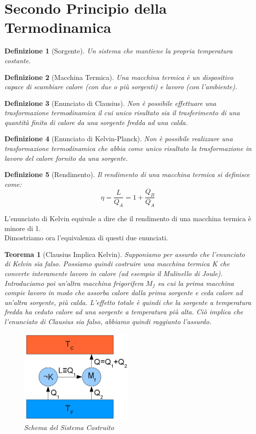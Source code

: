 \documentclass{article}
\newtheorem{thm}{Teorema}[section]
\newtheorem{defn}{Definizione}[section]
\newcommand{\note}{\noindent {\quad \bf \underline{Osservazione:}} \quad}
\begin{document}
\section{Secondo Principio della Termodinamica}
\begin{defn}[Sorgente]
Un sistema che mantiene la propria temperatura costante.
\end{defn}
\begin{defn}[Macchina Termica]
Una macchina termica è un dispositivo capace di scambiare calore (con due o più sorgenti) e lavoro (con l'ambiente). 
\end{defn}
\begin{defn}[Enunciato di Clausius]
Non è possibile effettuare una trasformazione termodinamica il cui unico risultato sia il trasferimento di una quantità finita di calore da una sorgente fredda ad una calda.
\end{defn}
\begin{defn}[Enunciato di Kelvin-Planck]
Non è possibile realizzare una trasformazione termodinamica che abbia come unico risultato la trasformazione in lavoro del calore fornito da una sorgente.
\end{defn}
\begin{defn}[Rendimento]
Il rendimento di una macchina termica si definisce come:
\[\eta=\frac{L}{Q_A}=1+\frac{Q_B}{Q_A}\]
\end{defn}
\note L'enunciato di Kelvin equivale a dire che il rendimento di una macchina termica è minore di 1.\\
Dimostriamo ora l'equivalenza di questi due enunciati.
\begin{thm}[Clausius Implica Kelvin]
Supponiamo per assurdo che l'enunciato di Kelvin sia falso. Possiamo quindi costruire una macchina termica K che converte interamente lavoro in calore (ad esempio il Mulinello di Joule). Introduciamo poi un'altra macchina frigorifera $M_f$ su cui la prima macchina compie lavoro in modo che assorba calore dalla prima sorgente e ceda calore ad un'altra sorgente, più calda. L'effetto totale è quindi che la sorgente a temperatura fredda ha ceduto calore ad una sorgente a temperatura più alta. Ciò implica che l'enunciato di Clausius sia falso, abbiamo quindi raggiunto l'assurdo.
\begin{figure}[H]
    \centering
    \includegraphics[width=0.5\textwidth]{Kelvin_dimostrazione_assurdo.png}
    \caption{Schema del Sistema Costruito}
    \label{ClausiusKelvin}
\end{figure}
\end{thm}
\end{document}

